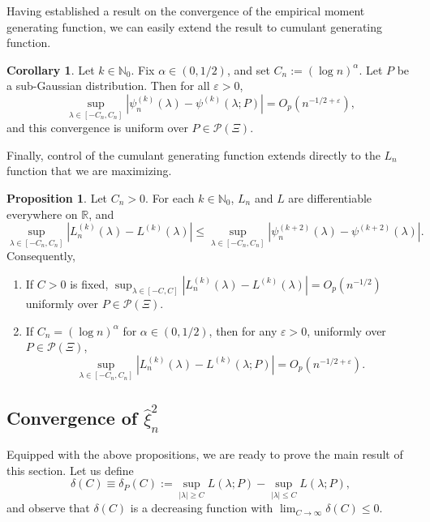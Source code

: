 \documentclass{article}
\theoremstyle{definition}
\newtheorem{proposition}{Proposition}
\newtheorem{corollary}{Corollary}
\newcommand*\eps{\epsilon}
\renewcommand*\epsilon{\varepsilon}
\newcommand{\R}{\mathbb{R}}
\newcommand{\N}{\mathbb{N}}
\newcommand{\1}{\mathbbm{1}}
\begin{document}
Having established a result on the convergence of the empirical moment generating function, we can easily extend the result to cumulant generating function. 
\begin{corollary}
\label{cor:cgf-unif-conv}
    Let $k \in \N_0$. Fix $\alpha \in (0, 1/2)$, and set $C_n := (\log n)^\alpha$. Let $P$ be a sub-Gaussian distribution. Then for all $\eps > 0$, 
    \[
    \sup_{\lambda \in [-C_n, C_n]}|\psi_n^{(k)}
(\lambda) - \psi^{(k)}(\lambda; P)| = O_p(n^{-1/2 + \eps}),   \]
and this convergence is uniform over $P \in \mathcal P(\Xi)$. 
\end{corollary}
Finally, control of the cumulant generating function extends directly to the $L_n$ function that we are maximizing. 
\begin{proposition}
\label{prop:L_n-cgf-bound}
    Let $C_n > 0$. For each $k \in \N_0$, $L_n$ and $L$ are differentiable everywhere on $\R$, and 
    \[
    \sup_{\lambda \in [-C_n, C_n]} |L_n^{(k)}(\lambda) - L^{(k)}(\lambda)| \leq \sup_{\lambda \in [-C_n, C_n]} |\psi^{(k+2)}_n(\lambda) - \psi^{(k+2)}(\lambda)|.
    \]
    Consequently, 
    \begin{enumerate}
        \item[(a)] If $C > 0$ is fixed, $\displaystyle \sup_{\lambda \in [-C, C]} |L_n^{(k)}(\lambda) - L^{(k)}(\lambda)| = O_p(n^{-1/2})$ uniformly over $P \in \mathcal{P}(\Xi)$. 
        \item[(b)] If $C_n = (\log n)^\alpha$ for $\alpha \in (0, 1/2)$, then for any $\eps > 0$, uniformly over $P \in \mathcal P(\Xi)$,
        \[
         \sup_{\lambda \in [-C_n, C_n]} |L_n^{(k)}(\lambda) - L^{(k)}(\lambda; P)| = O_p(n^{-1/2 + \eps}).
        \]
    \end{enumerate}
\end{proposition}


\subsection{Convergence of $\hat \xi_n^2$}
\label{sec:estimator-convergence}
Equipped with the above propositions, we are ready to prove the main result of this section. Let us define 
\[
\delta(C) \equiv \delta_P(C) := \sup_{|\lambda| \geq C} L(\lambda; P) - \sup_{|\lambda| \leq C} L(\lambda; P),
\]
and observe that $\delta(C)$ is a decreasing function with $\lim_{C \to \infty} \delta(C) \leq 0$.  
\end{document}
